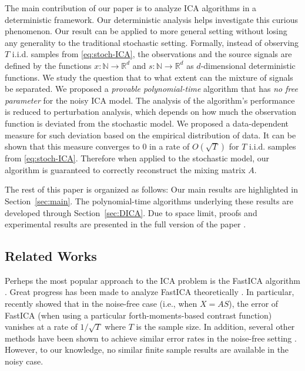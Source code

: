 \documentclass{article} %
\newcommand{\iid}{i.i.d.\xspace}
\newcommand{\ra}{\rightarrow}
\newcommand{\real}{\mathbb{R}}
\renewcommand{\natural}{\mathbb{N}}
\theoremstyle{definition}
\begin{document}
The main contribution of our paper is to analyze ICA algorithms in a deterministic framework. 
Our deterministic analysis helps investigate this curious phenomenon. Our result can be applied to more general setting without losing any generality to the traditional stochastic setting. 
Formally, instead of observing $T$ \iid samples from \eqref{eq:stoch-ICA}, the observations and the source signals are defined by the functions  $x:\natural \ra \real^d$ and $s:\natural \ra \real^d$ as $d$-dimensional deterministic functions. 
We study the question that to what extent can the mixture of signals be separated. 
We proposed a \emph{provable polynomial-time} algorithm that has \emph{no free parameter} for the noisy ICA model.
The analysis of the algorithm's performance is reduced to perturbation analysis, which depends on how much the observation function is deviated from the stochastic model. 
We proposed a data-dependent measure for such deviation based on the empirical distribution of data.
It can be shown that this measure converges to 0 in a rate of $O(\sqrt{T})$ for $T$ \iid samples from  \eqref{eq:stoch-ICA}.
Therefore when applied to the stochastic model, our algorithm is guaranteed to correctly reconstruct the mixing matrix $A$.

The rest of this paper is organized as follows: 
Our main results are highlighted in Section~\ref{sec:main}.
The polynomial-time algorithms underlying these results are developed through Section~\ref{sec:DICA}.
Due to space limit, proofs and experimental results are presented in the full version of the paper \citep{HuGySz15}.

\subsection{Related Works}
\label{subsec:relatedWorks}
Perheps the most popular approach to the ICA problem is the FastICA algorithm \citep{hyvarinen1999fast}. 
Great progress has been made to analyze FastICA theoretically \citep{tichavsky2006performance,oja2006fastica,ollila2010deflation,dermoune2013fastica,wei2014convergence}.
In particular, recently \citet{miettinen2014fourth} showed that in the noise-free case (i.e., when $X = AS$), the error of FastICA (when using a particular forth-moments-based contrast function) vanishes at a rate of $1/\sqrt{T}$ where $T$ is the sample size.
In addition, several other methods have been shown to achieve similar error rates in the noise-free setting \citep[e.g.,][]{eriksson2003characteristic,samarov2004nonparametric,chen2005consistent,chen2006efficient}.
However, to our knowledge, no similar finite sample results are available in the noisy case.
\end{document}
